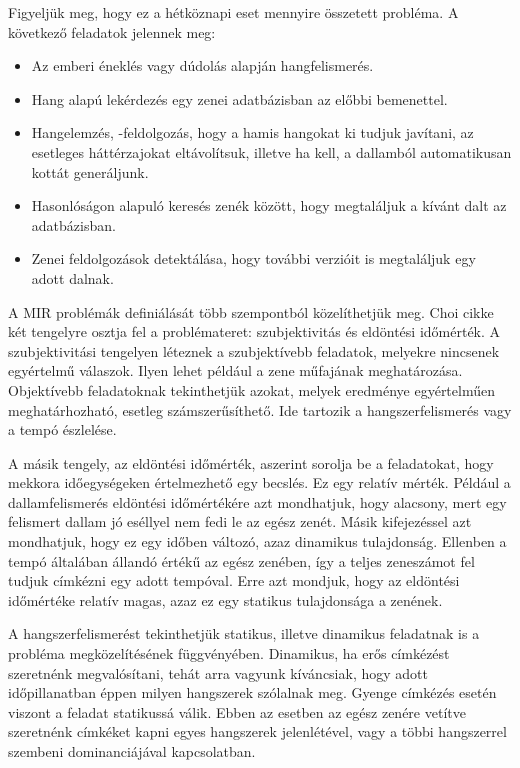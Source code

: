Figyeljük meg, hogy ez a hétköznapi eset mennyire összetett probléma. A következő feladatok jelennek meg:
\begin{itemize}
\item Az emberi éneklés vagy dúdolás alapján hangfelismerés.
\item Hang alapú lekérdezés egy zenei adatbázisban az előbbi bemenettel.
\item Hangelemzés, -feldolgozás, hogy a hamis hangokat ki tudjuk javítani, az esetleges háttérzajokat eltávolítsuk, illetve ha kell, a dallamból automatikusan kottát generáljunk.
\item Hasonlóságon alapuló keresés zenék között, hogy megtaláljuk a kívánt dalt az adatbázisban.
\item Zenei feldolgozások detektálása, hogy további verzióit is megtaláljuk egy adott dalnak.
\end{itemize}

A MIR problémák definiálását több szempontból közelíthetjük meg. Choi cikke \cite{Choi2017} két tengelyre osztja fel a problémateret: szubjektivitás és eldöntési időmérték. A szubjektivitási tengelyen léteznek a szubjektívebb feladatok, melyekre nincsenek egyértelmű válaszok. Ilyen lehet például a zene műfajának meghatározása. Objektívebb feladatoknak tekinthetjük azokat, melyek eredménye egyértelműen meghatárhozható, esetleg számszerűsíthető. Ide tartozik a hangszerfelismerés vagy a tempó észlelése. \cite{Choi2017}

A másik tengely, az eldöntési időmérték, aszerint sorolja be a feladatokat, hogy mekkora időegységeken értelmezhető egy becslés. Ez egy relatív mérték. Például a dallamfelismerés eldöntési időmértékére azt mondhatjuk, hogy alacsony, mert egy felismert dallam jó eséllyel nem fedi le az egész zenét. Másik kifejezéssel azt mondhatjuk, hogy ez egy időben változó, azaz dinamikus tulajdonság. Ellenben a tempó általában állandó értékű az egész zenében, így a teljes zeneszámot fel tudjuk címkézni egy adott tempóval. Erre azt mondjuk, hogy az eldöntési időmértéke relatív magas, azaz ez egy statikus tulajdonsága a zenének.\cite{Choi2017}

A hangszerfelismerést tekinthetjük statikus, illetve dinamikus feladatnak is a probléma megközelítésének függvényében. Dinamikus, ha erős címkézést szeretnénk megvalósítani, tehát arra vagyunk kíváncsiak, hogy adott időpillanatban éppen milyen hangszerek szólalnak meg. Gyenge címkézés esetén viszont a feladat statikussá válik. Ebben az esetben az egész zenére vetítve szeretnénk címkéket kapni egyes hangszerek jelenlétével, vagy a többi hangszerrel szembeni dominanciájával kapcsolatban.

